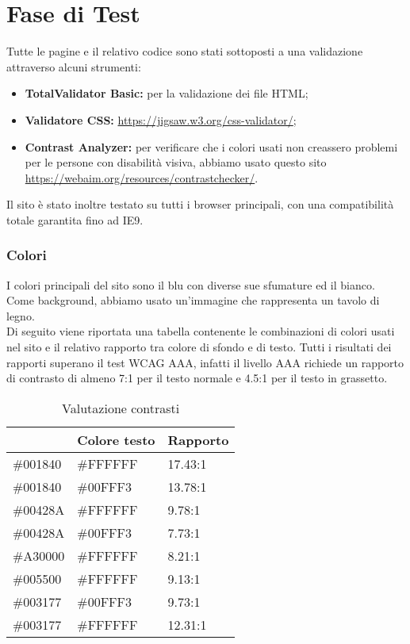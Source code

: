 \section{Fase di Test}
Tutte le pagine e il relativo codice sono stati sottoposti a una validazione attraverso alcuni strumenti:
\begin{itemize}
	\item \textbf{TotalValidator Basic:} per la validazione dei file HTML;
	\item \textbf{Validatore CSS:} \url{https://jigsaw.w3.org/css-validator/};
	\item \textbf{Contrast Analyzer:} per verificare che i colori usati non creassero problemi per le persone con disabilità visiva, abbiamo usato questo sito \url{https://webaim.org/resources/contrastchecker/}.
\end{itemize}
Il sito è stato inoltre testato su tutti i browser principali, con una compatibilità totale garantita fino ad IE9.

\subsubsection{Colori} I colori principali del sito sono il blu con diverse sue sfumature ed il bianco. Come background, abbiamo usato un'immagine che rappresenta un tavolo di legno.\\
Di seguito viene riportata una tabella contenente le combinazioni di colori usati nel sito e il relativo rapporto tra colore di sfondo e di testo. Tutti i risultati dei rapporti superano il test WCAG AAA, infatti il livello AAA richiede un rapporto di contrasto di almeno 7:1 per il testo normale e 4.5:1 per il testo in grassetto.
\begin{center}
	\renewcommand{\arraystretch}{1.8}
	\begin{longtable}[H]{l l l}
		\caption{Valutazione contrasti}\\
		\rowcolor[HTML]{009ABB}
		\multicolumn{1}{c}{\color[HTML]{FFFFFF} \textbf{Colore sfondo}} &
		\multicolumn{1}{c}{\color[HTML]{FFFFFF} \textbf{Colore testo}} &
		\multicolumn{1}{c}{\color[HTML]{FFFFFF} \textbf{Rapporto}} \\
		\endhead
		\#001840 & \#FFFFFF & 17.43:1\\
		\#001840 & \#00FFF3 & 13.78:1\\
		\#00428A & \#FFFFFF & 9.78:1\\
		\#00428A & \#00FFF3 & 7.73:1\\
		\#A30000 & \#FFFFFF & 8.21:1\\
		\#005500 & \#FFFFFF & 9.13:1\\
		\#003177 & \#00FFF3 & 9.73:1\\
		\#003177 & \#FFFFFF & 12.31:1\\
	\end{longtable}
\end{center}